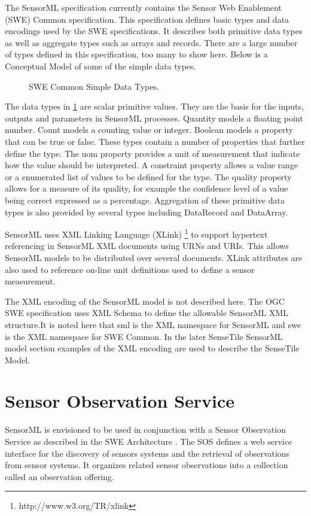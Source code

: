 \documentclass[]{final_report}
\begin{document}
The SensorML specification currently contains the Sensor Web Enablement (SWE) Common specification. This specification defines basic types and data encodings used by the SWE specifications. It describes both primitive data types as well as aggregate types such as arrays and records. There are a large number of types defined in this specification, too many to show here. Below is a Conceptual Model of some of the simple data types.

\begin{figure}[h]
\caption{SWE Common Simple Data Types.}\label{fig:SWESimpleConceptualModel}
\end{figure}

The data types in \ref{fig:SWESimpleConceptualModel} are scalar primitive values. They are the basis for the inputs, outputs and parameters in SensorML processes. Quantity models a floating point number. Count models a counting value or integer.  Boolean models a property that can be true or false. These types contain a number of properties that further define the type. The uom property provides a unit of measurement that indicate how the value should be interpreted.  A constraint property allows a value range or a enumerated list of values to be defined for the type. The quality property allows for a measure of its quality, for example the confidence level of a value being correct expressed as a percentage. Aggregation of these primitive data types is also provided by several types including DataRecord and DataArray.

SensorML uses XML Linking Language (XLink) \footnote{http://www.w3.org/TR/xlink} to support hypertext referencing in SensorML XML documents using URNs and URIs. This allows SensorML models to be distributed over several documents. XLink attributes are also used to reference on-line unit definitions used to define a sensor measurement.

The XML encoding of the SensorML model is not described here. The OGC SWE specification uses XML Schema to define the allowable SensorML XML structure.It is noted here that sml is the XML namespace for SensorML and swe is the XML namespace for SWE Common. In the later SenseTile SensorML model section examples of the XML encoding are used to describe the SenseTile Model. 

\section{Sensor Observation Service}
SensorML is envisioned to be used in conjunction with a Sensor Observation Service as described in the SWE Architecture \cite{SOSref}. The SOS defines a web service interface for the discovery of sensors systems and the retrieval of observations from sensor systems. It organizes related sensor observations into a collection called an observation offering.   
\end{document}

